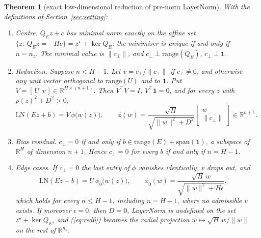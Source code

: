 \documentclass[11pt]{article}
\theoremstyle{plainnote}
\newtheorem{theorem}{Theorem}
\newcommand{\R}{\mathbb R}
\newcommand{\one}{\mathbf 1}
\newcommand{\cp}{c_\perp}
\begin{document}
\begin{theorem}[exact low-dimensional reduction of pre-norm LayerNorm]\label{thm:red}
With the definitions of Section~\ref{sec:setting}:
\begin{enumerate}
\item[(i)] Centre. $Q_Ez+c$ has minimal norm exactly on the affine set $\{z:\ Q_Ez=-\Pi c\}=z^\star+\ker Q_E$; the minimiser is unique if and only if $n=n_z$. The minimal value is $\|\cp\|$, and $\cp\perp\mathrm{range}(Q_E)$, $\cp\perp\one$.
\item[(ii)] Reduction. Suppose $n<H-1$. Let $v=\cp/\|\cp\|$ if $\cp\neq0$, and otherwise any unit vector orthogonal to $\mathrm{range}(U)$ and to $\one$. Put $V=[\,U\ \ v\,]\in\R^{H\times(n+1)}$. Then $V^\top V=I$, $V^\top\one=0$, and for every $z$ with $\rho(z)^2+D^2>0$,
\begin{equation}
\mathrm{LN}(Ez+b)=V\,\phi\big(w(z)\big),\qquad \phi(w)=\frac{\sqrt H}{\sqrt{\|w\|^2+D^2}}\begin{bmatrix} w\\ \|\cp\|\end{bmatrix}\in\R^{n+1}.
\label{eq:red}
\end{equation}
\item[(iii)] Bias residual. $\cp=0$ if and only if $b\in\mathrm{range}(E)+\mathrm{span}(\one)$, a subspace of $\R^H$ of dimension $n+1$. Hence $\cp=0$ for every $b$ if and only if $n=H-1$.
\item[(iv)] Edge cases. If $\cp=0$ the last entry of $\phi$ vanishes identically, $v$ drops out, and
\begin{equation}
\mathrm{LN}(Ez+b)=U\,\phi_0\big(w(z)\big),\qquad \phi_0(w)=\frac{\sqrt H\,w}{\sqrt{\|w\|^2+H\epsilon}},
\label{eq:red0}
\end{equation}
which holds for every $n\le H-1$, including $n=H-1$, where no admissible $v$ exists. If moreover $\epsilon=0$, then $D=0$, LayerNorm is undefined on the set $z^\star+\ker Q_E$, and (\ref{eq:red0}) becomes the radial projection $w\mapsto\sqrt H\,w/\|w\|$ on the rest of $\R^{n_z}$.
\end{enumerate}
\end{theorem}
\end{document}
